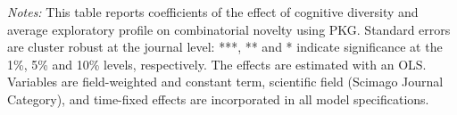 \begin{table}[h!]
{\begin{threeparttable}
\begin{tabular}{@{\extracolsep{5pt}}lD{.}{.}{-3} D{.}{.}{-3} D{.}{.}{-3} D{.}{.}{-3} D{.}{.}{-3} }
\end{tabular} 
\begin{tablenotes}
 \footnotesize
 \justifying \item {\it Notes:}
 This table reports coefficients of the effect of cognitive diversity and average exploratory profile on combinatorial novelty using PKG. Standard errors are cluster robust at the journal level: ***, ** and * indicate significance at the 1\%, 5\% and 10\% levels, respectively. The effects are estimated with an OLS. Variables are field-weighted and constant term, scientific field (Scimago Journal Category), and time-fixed effects are incorporated in all model specifications.
 \end{tablenotes}
 \end{threeparttable}
 }
\label{ref_cog_nov_fw}
\end{table} 